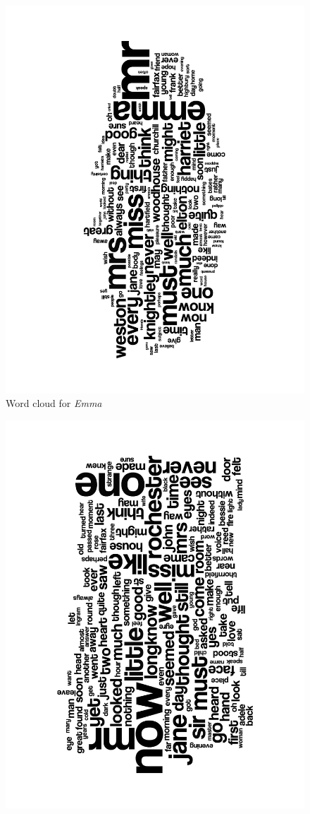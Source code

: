 \documentclass[a4paper,11pt,oneside]{book}
\begin{document}
\begin{enumerate}
\begin{figure}[htb]
					\label{wcAnna}%
				\end{figure}
				\begin{figure}[htb]
					\begin{center}
					\includegraphics[angle=270,width=0.8\columnwidth]{resources/wordclouds/Emma_WordCloud.pdf}%
					\end{center}
					\caption{Word cloud for \emph{Emma}}%
					\label{wcEmma}%
				\end{figure}
				\begin{figure}[htb] 
					\begin{center}
					\includegraphics[angle=270,width=0.8\columnwidth]{resources/wordclouds/JaneEyre_WordCloud.pdf}%

\end{center}
\end{figure}
\end{enumerate}
\end{document}
